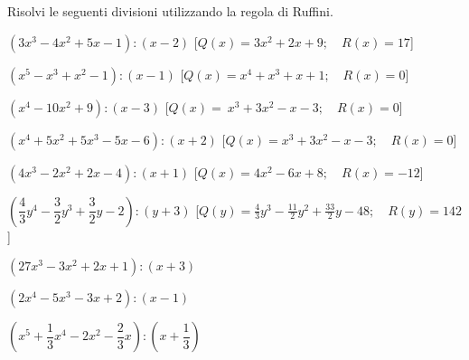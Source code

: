 \begin{esercizio}[\Ast]
\label{ese:div.005}
Risolvi le seguenti divisioni utilizzando la regola di Ruffini.
 \begin{enumeratea}
 \item $\left(3x^{3}-4x^{2}+5x-1\right):(x-2)$%
  \hfill[$Q(x)=3x^{2}+2x+9; \quad R(x)=17$]
 \item $\left(x^{5}-x^{3}+x^{2}-1\right):(x-1)$%
  \hfill[$Q(x)=x^{4}+x^{3}+x+1; \quad R(x)=0$]
 \item $\left(x^{4}-10x^{2}+9\right):(x-3)$%
  \hfill[$Q(x)=~x^{3}+3x^{2}-x-3; \quad R(x)=0$]
 \item $\left(x^{4}+5x^{2}+5x^{3}-5x-6 \right):(x+2)$%
  \hfill[$Q(x)=x^{3}+3x^{2}-x-3; \quad R(x)=0$]
 \item $\left(4x^{3}-2x^{2}+2x-4 \right):(x+1)$%
  \hfill[$Q(x)=4x^{2}-6x+8; \quad R(x)=-12$]
 \item $\left(\dfrac{4}{3}y^{4}-\dfrac{3}{2}y^{3}+\dfrac{3}{2}y-2\right):
        \left(y+3\right)$
  \hfill[$Q(y)=\frac{4}{3}y^{3}-\frac{11}{2}y^{2}+\frac{33}{2}y-48; 
          \quad R(y)=142$]
 \item $\left(27x^{3}-3x^{2}+2x+1\right):(x+3)$
 \item $\left(2x^{4}-5x^{3}-3x+2\right):(x-1)$
 \item $\left(x^{5}+\dfrac{1}{3}x^{4}-2x^{2}-\dfrac{2}{3}x\right):
        \left(x+\dfrac{1}{3}\right)$
 \end{enumeratea}
\end{esercizio}

